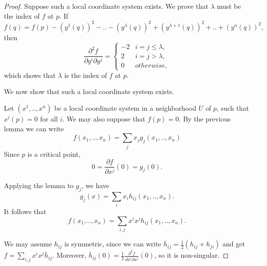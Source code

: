 \documentclass[a4paper,11pt,reqno]{amsart}
\begin{document}
\begin{proof}
  Suppose such a local coordinate system exists. We prove that $\lambda$ must be
  the index of $f$ at $p$. If
  \begin{equation}
        f(q) = f(p) - (y^1(q))^2 - .. - (y^\lambda(q))^2 + (y^{\lambda+1}(q))^2 + .. + (y^n(q))^2,
  \end{equation}
  then
  \begin{equation}
    \frac{\partial^2 f}{\partial y^i \partial y^j} = 
    \begin{cases}
      -2 & i = j \le \lambda, \\
      2  & i = j > \lambda, \\
      0  & otherwise,
    \end{cases}
  \end{equation}
  which shows that $\lambda$ is the index of $f$ at $p$.


  We now show that such a local coordinate system exists.

  
  Let $(x^1, .., x^n)$ be a local coordinate system in a neighborhood $U$ of
  $p$, such that $x^i(p) = 0$ for all $i$. We may also suppose that $f(p) = 0$.
  By the previous lemma we can write
  \begin{equation}
    f(x_1, .., x_n) = \sum_j x_jg_j(x_1, .., x_n)
  \end{equation}
  Since $p$ is a critical point, 
  \begin{equation}
    0 = \frac{\partial f}{\partial x^j}(0) = g_j(0).
  \end{equation}
  
  Applying the lemma to $g_j$, we have
  \begin{equation}
    g_j(x) = \sum_i x_ih_{ij}(x_1, .., x_n).
  \end{equation}
  It follows that
  \begin{equation}
    f(x_1, .., x_n) = \sum_{i,j} x^ix^jh_{ij}(x_1, .., x_n).
  \end{equation}
  
  We may assume $h_{ij}$ is symmetric, since we can write $\bar{h}_{ij} =
  \frac{1}{2}(h_{ij}+h_{ji})$ and get $f = \sum_{i,j}
  x^ix^j\bar{h}_{ij}$. Moreover, $\bar{h}_{ij}(0) = \frac{1}{2}\frac{\partial^2
    f}{\partial x^i \partial x^j}(0)$, so it is non-singular.


\end{proof}
\end{document}
